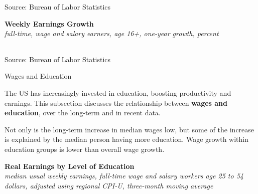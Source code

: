 \documentclass{report}
\begin{document}
{\begin{minipage}{0.76\textwidth}
\footnotesize{Source: Bureau of Labor Statistics}
\vspace{3mm}

\normalsize \textbf{Weekly Earnings Growth}\\
\footnotesize{\textit{full-time, wage and salary earners, age 16+, one-year growth, percent}}\\
 \setlength{\tabcolsep}{3.1pt} \color{black!90}
	{\renewcommand{\arraystretch}{1.55}
		\begin{tabular}{p{17mm} R{8.8mm} R{8.8mm} R{8.8mm} R{8.8mm} R{8.8mm} R{8.8mm} 
		   R{8.8mm} R{8.8mm} R{8.8mm} R{8.8mm}}
			  \hline
		\end{tabular}}\vspace{-2mm}
				
\footnotesize{Source: Bureau of Labor Statistics}
\end{minipage}
\newpage
\vspace*{-10mm}

\begin{minipage}{0.76\textwidth} 
\normalsize{Wages and Education}
\vspace*{-1mm}

\small The US has increasingly invested in education, boosting productivity and earnings. This subsection discusses the relationship between \textbf{wages and education}, over the long-term and in recent data. 



Not only is the long-term increase in median wages low, but some of the increase is explained by the median person having more education. Wage growth within education groups is lower than overall wage growth. 
\vspace{1mm}

\normalsize \textbf{Real Earnings by Level of Education}\\
\footnotesize{\textit{median usual weekly earnings, full-time wage and salary workers age 25 to 54}}\\
\footnotesize{\textit{dollars, adjusted using regional CPI-U, three-month moving average}}
\vspace{4.3cm}


\end{minipage}}
\end{document}
